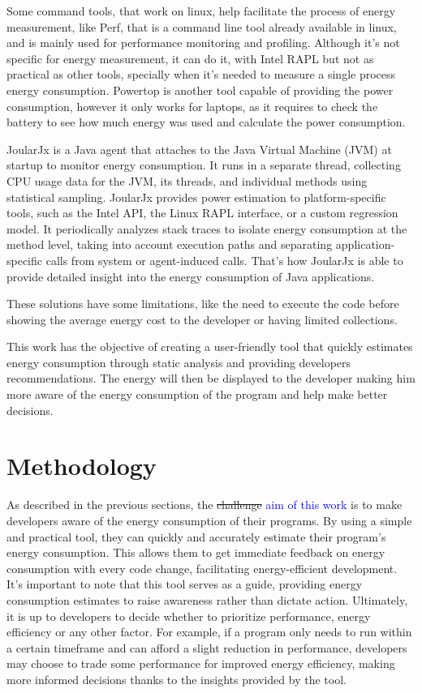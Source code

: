 \documentclass[sigplan]{acmart}
\newcommand{\wnote}[1]{\textcolor{blue}{#1}}
\begin{document}
Some command tools, that work on linux, help facilitate the process of energy measurement, like Perf\cite{perfwiki_main}, that is a command line tool already available in linux, and is mainly used for performance monitoring and profiling. Although it's not specific for energy measurement, it can do it, with Intel RAPL but not as practical as other tools, specially when it's needed to measure a single process energy consumption. Powertop\cite{archlinux_Powertop} is another tool capable of providing the power consumption, however it only works for laptops, as it requires to check the battery to see how much energy was used and calculate the power consumption.

JoularJx\cite{noureddine-ie-2022} is a Java agent that attaches to the Java Virtual Machine (JVM) at startup to monitor energy consumption. It runs in a separate thread, collecting CPU usage data for the JVM, its threads, and individual methods using statistical sampling. JoularJx provides power estimation to platform-specific tools, such as the Intel API, the Linux RAPL interface, or a custom regression model. It periodically analyzes stack traces to isolate energy consumption at the method level, taking into account execution paths and separating application-specific calls from system or agent-induced calls. That's how JoularJx is able to provide detailed insight into the energy consumption of Java applications.

These solutions have some limitations, like the need to execute the code before showing the average energy cost to the developer or having limited collections.

This work has the objective of creating a user-friendly tool that quickly estimates energy consumption through static analysis and providing developers recommendations. The energy will then be displayed to the developer making him more aware of the energy consumption of the program and help make better decisions.

\section{Methodology} \label{sec:work}

As described in the previous sections, the \st{challenge} \wnote{aim of this work} is to make developers aware of the energy consumption of their programs. By using a simple and practical tool, they can quickly and accurately estimate their program's energy consumption. This allows them to get immediate feedback on energy consumption with every code change, facilitating energy-efficient development. It's important to note that this tool serves as a guide, providing energy consumption estimates to raise awareness rather than dictate action. Ultimately, it is up to developers to decide whether to prioritize performance, energy efficiency or any other factor. For example, if a program only needs to run within a certain timeframe and can afford a slight reduction in performance, developers may choose to trade some performance for improved energy efficiency, making more informed decisions thanks to the insights provided by the tool.
\end{document}
